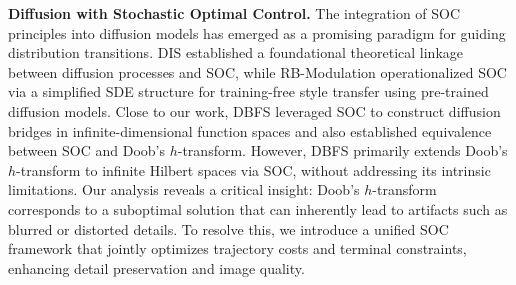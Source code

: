 \textbf{Diffusion with Stochastic Optimal Control.} The integration of SOC principles into diffusion models has emerged as a promising paradigm for guiding distribution transitions. DIS \cite{berner2024optimalcontrolperspectivediffusionbased} established a foundational theoretical linkage between diffusion processes and SOC, while RB-Modulation \cite{RB} operationalized SOC via a simplified SDE structure for training-free style transfer using pre-trained diffusion models. Close to our work, DBFS \cite{park2024stochasticoptimalcontroldiffusion} leveraged SOC to construct diffusion bridges in infinite-dimensional function spaces and also established equivalence between SOC and Doob's $h$-transform. However, DBFS primarily extends Doob's $h$-transform to infinite Hilbert spaces via SOC, without addressing its intrinsic limitations. Our analysis reveals a critical insight: Doob's $h$-transform corresponds to a suboptimal solution that can inherently lead to artifacts such as blurred or distorted details. To resolve this, we introduce a unified SOC framework that jointly optimizes trajectory costs and terminal constraints, enhancing detail preservation and image quality. 






